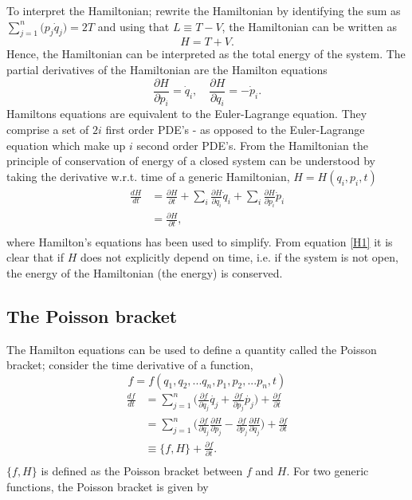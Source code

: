 To interpret the Hamiltonian; rewrite the Hamiltonian by identifying the sum as $\sum_{j=1}^{n}\big(p_j\dot{q}_j\big)=2T$ and using that $L\equiv T-V$, the Hamiltonian can be written as
\begin{equation}
	H=T+V.
\end{equation} 
Hence, the Hamiltonian can be interpreted as the total energy of the system. The partial derivatives of the Hamiltonian are the Hamilton equations
\begin{equation}
	\frac{\partial H}{\partial p_i}=\dot{q}_i, \quad \frac{\partial H}{\partial q_i}=-\dot{p}_i.
	\label{ham1}
\end{equation} 
Hamiltons equations are equivalent to the Euler-Lagrange equation. They comprise a set of $2i$ first order PDE's - as opposed to the Euler-Lagrange equation which make up $i$ second order PDE's. From the Hamiltonian the principle of conservation of energy of a closed system can be understood by taking the derivative w.r.t. time of a generic Hamiltonian, $H=H(q_i,p_i,t)$
\begin{equation}
	\begin{split}
		\frac{dH}{dt}&=\frac{\partial H}{\partial t}+\sum_i\frac{\partial H}{\partial q_i}\dot{q}_i+\sum_i\frac{\partial H}{\partial p_i}\dot{p}_i\\
		&=\frac{\partial H}{\partial t},\\
	\end{split}
	\label{H1}
\end{equation} 
where Hamilton's equations has been used to simplify. From equation \eqref{H1} it is clear that if $H$ does not explicitly depend on time, i.e. if the system is not open, the energy of the Hamiltonian (the energy) is conserved.

\subsection*{The Poisson bracket}
The Hamilton equations can be used to define a quantity called the Poisson bracket; consider the time derivative of a function,
\begin{equation}
	f=f(q_1,q_2,...q_n,p_1,p_2,...p_n,t)
\end{equation}
\begin{equation}
	\begin{split}
		\frac{d f}{dt}
		&=\sum_{j=1}^{n}\bigg(\frac{\partial f}{\partial q_j}\dot{q_j}+\frac{\partial f}{\partial p_j}\dot{p_j}\bigg)+\frac{\partial f}{\partial t}\\
		&=\sum_{j=1}^{n}\bigg(\frac{\partial f}{\partial q_j}\frac{\partial H}{\partial p_j}-\frac{\partial f}{\partial p_j}\frac{\partial H}{\partial q_j}\bigg)+\frac{\partial f}{\partial t}\\
		&\equiv\{f,H\}+\frac{\partial f}{\partial t}.\\
	\end{split}
	\label{pois2}
\end{equation} 
$\{f,H\}$ is defined as the Poisson bracket between $f$ and $H$. For two generic functions, the Poisson bracket is given by

